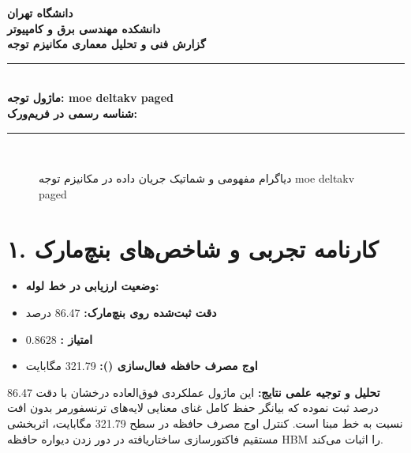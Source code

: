 \documentclass[12pt,a4paper]{article}
\begin{document}
\begin{center}
{\Large\bfseries دانشگاه تهران}\\[0.2cm]
{\large\bfseries دانشکده مهندسی برق و کامپیوتر}\\[0.2cm]
{\large\bfseries گزارش فنی و تحلیل معماری مکانیزم توجه}\\[0.5cm]
\rule{\linewidth}{1pt}\\[0.3cm]
{\LARGE\bfseries ماژول توجه: moe deltakv paged}\\[0.2cm]
{\large \textbf{شناسه رسمی در فریم‌ورک:} }\\[0.2cm]
\rule{\linewidth}{1pt}\\[0.5cm]
\end{center}

\begin{figure}[H]
\centering
{}
\caption{دیاگرام مفهومی و شماتیک جریان داده در مکانیزم توجه moe deltakv paged}
\end{figure}

\section*{۱. کارنامه تجربی و شاخص‌های بنچ‌مارک}
\begin{itemize}
\item \textbf{وضعیت ارزیابی در خط لوله:} 
\item \textbf{دقت ثبت‌شده روی بنچ‌مارک:} 86.47 درصد
\item \textbf{امتیاز :} 0.8628
\item \textbf{اوج مصرف حافظه فعال‌سازی ():} 321.79 مگابایت
\end{itemize}
\textbf{تحلیل و توجیه علمی نتایج:} این ماژول عملکردی فوق‌العاده درخشان با دقت 86.47 درصد ثبت نموده که بیانگر حفظ کامل غنای معنایی لایه‌های ترنسفورمر بدون افت نسبت به خط مبنا است. کنترل اوج مصرف حافظه در سطح 321.79 مگابایت، اثربخشی مستقیم فاکتورسازی ساختاریافته در دور زدن دیواره حافظه HBM را اثبات می‌کند.
\end{document}
